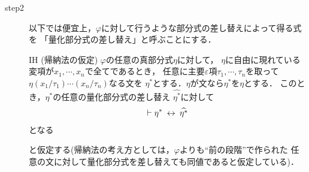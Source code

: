\begin{sketch}
\begin{description}
				
			\item[step2]
				以下では便宜上，$\varphi$に対して行うような部分式の差し替えによって得る式を
				「量化部分式の差し替え」と呼ぶことにする．
				
				\begin{itembox}[l]{IH (帰納法の仮定)}
					$\varphi$の任意の真部分式$\eta$に対して，
					$\eta$に自由に現れている変項が$x_{1},\cdots,x_{n}$で全てであるとき，
					任意に主要$\varepsilon$項$\tau_{1},\cdots,\tau_{n}$を取って
					$\eta(x_{1}/\tau_{1})\cdots(x_{n}/\tau_{n})$なる文を
					$\eta^{*}$とする．$\eta$が文なら$\eta^{*}$を$\eta$とする．
					このとき，$\eta^{*}$の任意の量化部分式の差し替え
					$\widehat{\eta^{*}}$に対して
					\begin{align}
						\vdash \eta^{*} \hspace{0.25em}\leftrightarrow\hspace{0.25em} \widehat{\eta^{*}}
					\end{align}
					となる
				\end{itembox}
				と仮定する(帰納法の考え方としては，$\varphi$よりも``前の段階''で作られた
				任意の文に対して量化部分式を差し替えても同値であると仮定している)．
				

\end{description}
\end{sketch}
